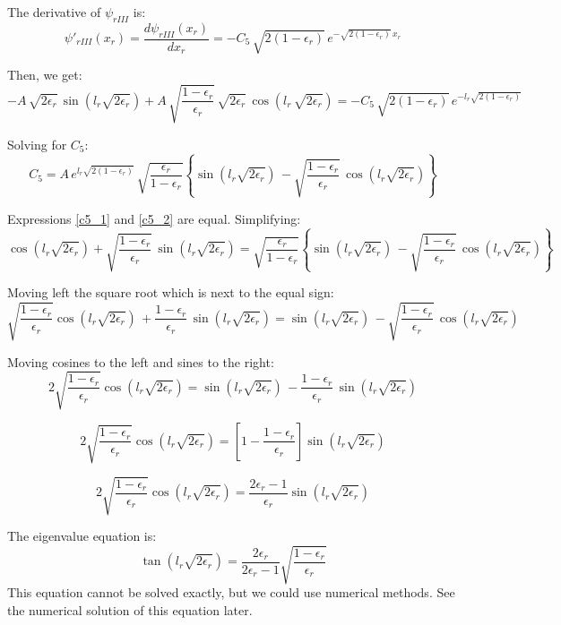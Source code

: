 The derivative of $\psi_{rIII}$ is:
\[
\psi'_{rIII}(x_r) = \frac{d\psi_{rIII}(x_r)}{dx_r}
  = -C_5\,\sqrt{2(1-\epsilon_r)}\,e^{-\sqrt{2(1-\epsilon_r)}\,x_r}
\]

Then, we get:
\[
-A\,\sqrt{2\epsilon_r}\,\sin\left(l_r\sqrt{2\epsilon_r}\right)
 + A\,\sqrt{\frac{1-\epsilon_r}{\epsilon_r}}\,\sqrt{2\epsilon_r}
   \,\cos\left(l_r\,\sqrt{2\epsilon_r}\right)
=
-C_5\,\sqrt{2(1-\epsilon_r)}\,e^{-l_r\sqrt{2(1-\epsilon_r)}}
\]

Solving for $C_5$:
\begin{equation}
\label{c5_2}
C_5 = A\,e^{l_r\sqrt{2(1-\epsilon_r)}}\,\sqrt{\frac{\epsilon_r}{1-\epsilon_r}}
  \left\lbrace\sin\left(l_r\sqrt{2\epsilon_r}\right)\,
  - \sqrt{\frac{1-\epsilon_r}{\epsilon_r}}\,
       \cos\left(l_r\sqrt{2\epsilon_r}\right)\right\rbrace
\end{equation}

Expressions \ref{c5_1} and \ref{c5_2} are equal. Simplifying:
\[
\cos\left(l_r\sqrt{2\epsilon_r}\right) 
  + \sqrt{\frac{1-\epsilon_r}{\epsilon_r}}\,
         \sin\left(l_r\sqrt{2\epsilon_r}\right)
=
\sqrt{\frac{\epsilon_r}{1-\epsilon_r}}
  \left\lbrace\sin\left(l_r\sqrt{2\epsilon_r}\right)\,
  - \sqrt{\frac{1-\epsilon_r}{\epsilon_r}}\,
       \cos\left(l_r\sqrt{2\epsilon_r}\right)\right\rbrace
\]

Moving left the square root which is next to the equal sign:
\[
\sqrt{\frac{1-\epsilon_r}{\epsilon_r}}
\cos\left(l_r\sqrt{2\epsilon_r}\right)\,
  + \frac{1-\epsilon_r}{\epsilon_r}\,
         \sin\left(l_r\sqrt{2\epsilon_r}\right)
=
  \sin\left(l_r\sqrt{2\epsilon_r}\right)\,
  - \sqrt{\frac{1-\epsilon_r}{\epsilon_r}}\,
       \cos\left(l_r\sqrt{2\epsilon_r}\right)
\]

Moving cosines to the left and sines to the right:
\[
2\sqrt{\frac{1-\epsilon_r}{\epsilon_r}}
\cos\left(l_r\sqrt{2\epsilon_r}\right) 
=
  \sin\left(l_r\sqrt{2\epsilon_r}\right)\,
  - \frac{1-\epsilon_r}{\epsilon_r}\,
       \sin\left(l_r\sqrt{2\epsilon_r}\right)
\]

\[
2\sqrt{\frac{1-\epsilon_r}{\epsilon_r}}
\cos\left(l_r\sqrt{2\epsilon_r}\right) 
=
  \left[1-\frac{1-\epsilon_r}{\epsilon_r}\right]
  \sin\left(l_r\sqrt{2\epsilon_r}\right)
\]

\[
2\sqrt{\frac{1-\epsilon_r}{\epsilon_r}}
\cos\left(l_r\sqrt{2\epsilon_r}\right) 
=
  \frac{2\epsilon_r-1}{\epsilon_r}
  \sin\left(l_r\sqrt{2\epsilon_r}\right)
\]

The eigenvalue equation is:
\begin{equation}
\label{eigenvalue_eq}
\tan\left(l_r\sqrt{2\epsilon_r}\right)
=
\frac{2\epsilon_r}{2\epsilon_r-1}
\sqrt{\frac{1-\epsilon_r}{\epsilon_r}}
\end{equation}
This equation cannot be solved exactly, but we could use numerical methods.
See the numerical solution of this equation later.

